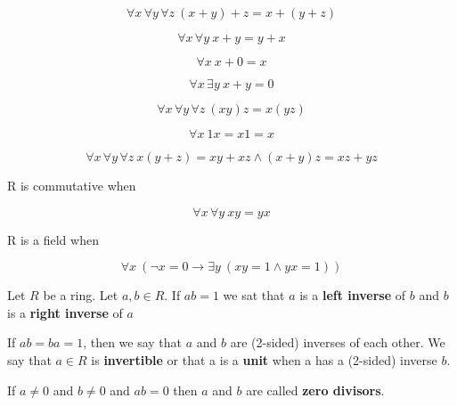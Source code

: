 
\begin{axiom}\label{axm1}
\[\forall x \,\forall y\,\forall z \ (x+y) + z = x + (y+z)\]
\end{axiom}
\begin{axiom}\label{axm2}
\[\forall x \,\forall y \ x+y = y+x\]
\end{axiom}
\begin{axiom}\label{axm3}
\[\forall x \ x+0 = x\]
\end{axiom}
\begin{axiom}\label{axm4}
\[\forall x \,\exists y \ x+ y= 0\]
\end{axiom}
\begin{axiom}\label{axm5}
\[\forall x \,\forall y\,\forall z \ (xy)z = x(yz)\]
\end{axiom}
\begin{axiom}\label{axm6}
\[\forall x  \ 1 x= x 1 = x\]
\end{axiom}
\begin{axiom}\label{axm7}
\[\forall x \,\forall y\,\forall z \ x(y+z) = xy+xz \wedge (x+y)z = xz + yz\]
\end{axiom}

R is commutative when
\begin{axiom}\label{axm8}
\[\forall x \,\forall y \ xy=yx\]
\end{axiom}

R is a field when
\begin{axiom}\label{axm9}
\[\forall x \ (\neg x = 0 \to \exists y \ (xy=1\wedge yx = 1))\]
\end{axiom}


\begin{defn}
Let $R$ be a ring. Let $a,b\in R$. If $ab = 1$ we sat that $a$ is a \textbf{left inverse} of $b$ and $b$ is a \textbf{right inverse} of $a$
\end{defn}

If $ab = ba =1$, then we say that $a$ and $b$ are (2-sided) inverses of each other. We say that $a\in R$ is \textbf{invertible} or that a is a \textbf{unit} when a has a (2-sided) inverse $b$.

If $a\neq 0$ and $b\neq 0$ and $ab=0$ then $a$ and $b$ are called \textbf{zero divisors}.


